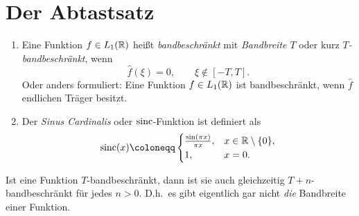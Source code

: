 \section{Der Abtastsatz}

\begin{definition}\leavevmode
\begin{enumerate}
\item Eine Funktion $ f \in L_{1}(\mathbb{R}) $ heißt \emph{bandbeschränkt} mit \emph{Bandbreite $ T $} oder
  kurz \emph{$ T $-bandbeschränkt}, wenn
  \[
    \widehat{f}(\xi) = 0, \qquad \xi \notin [-T,T].
  \]
  Oder anders formuliert: Eine Funktion $ f \in L_{1}(\mathbb{R}) $ ist bandbeschränkt, wenn $ \widehat{f} $
  endlichen Träger besitzt.
\item Der \emph{Sinus Cardinalis} oder $ \operatorname{sinc} $-Funktion ist definiert als
  \[
    \sinc(x) \coloneqq \begin{cases}
      \frac{\sin(\pi x)}{\pi x}, & x \in \R \setminus \{ 0 \}, \\
      1, & x = 0.
    \end{cases}
  \]
\end{enumerate}
\end{definition}

\begin{remark}[Bandbeschränktheit]
Ist eine Funktion $ T $-bandbeschränkt, dann ist sie auch gleichzeitig $ T + n $-bandbeschränkt für
jedes $ n > 0 $. D.h.\ es gibt eigentlich gar nicht \emph{die} Bandbreite einer Funktion.
\end{remark}

